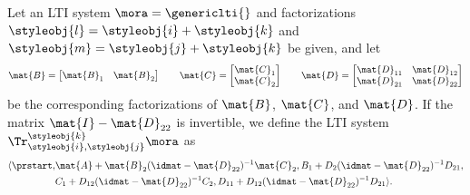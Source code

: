 {    \begin{definition}\label{def:trace-lti}
        Let an LTI system $\mora = \genericlti{}$ and factorizations $\styleobj{l} = \styleobj{i} + \styleobj{k}$ and $\styleobj{m} = \styleobj{j} + \styleobj{k}$ be given, and let
        \begin{equation}\label{LTI-induced-block-forms}
            \mat{B} =
            \begin{bmatrix}
                \mat{B}_1 & \mat{B}_2
            \end{bmatrix}
            \qquad
            \mat{C} =
            \begin{bmatrix}
                \mat{C}_1 \\
                \mat{C}_2
            \end{bmatrix}
            \qquad
            \mat{D} =
            \begin{bmatrix}
                \mat{D}_{11} & \mat{D}_{12} \\
                \mat{D}_{21} & \mat{D}_{22}
            \end{bmatrix}
        \end{equation}
        be the corresponding factorizations of $\mat{B}$, $\mat{C}$, and $\mat{D}$. If the matrix $\mat{I} - \mat{D}_{22}$ is invertible, we define the LTI system $\Tr_{\styleobj{i},\styleobj{j}}^{\styleobj{k}}\mora$ as
        \begin{equation}
            \begin{aligned}
                \langle\prstart, & \mat{A} + \mat{B}_2 (\idmat- \mat{D}_{22})^{-1} \mat{C}_2 , B_1 + D_2(\idmat- \mat{D}_{22})^{-1}
                D_{21}, \\
                                 & C_1 + D_{12}(\idmat- \mat{D}_{22})^{-1}C_2, D_{11} + D_{12}(\idmat- \mat{D}_{22})^{-1}D_{21} \rangle.
            \end{aligned}
        \end{equation}
    \end{definition}

}
